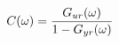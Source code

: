 \documentclass[preview]{standalone}
\begin{document}
\begin{align*}
\special{dvisvgm:raw <g id='unique000'>}C(\omega)=\frac{G_{ur}(\omega)}{1-G_{yr}(\omega)}\special{dvisvgm:raw </g>}
\end{align*}
\end{document}
